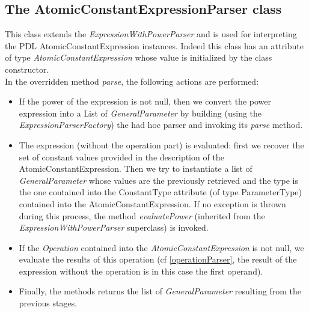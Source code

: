 \documentclass[a4paper,11pt] {ivoa}
\begin{document}
\subsection{The AtomicConstantExpressionParser class}
This class extends the {\it ExpressionWithPowerParser} and is used for interpreting the PDL {AtomicConstantExpression} instances. Indeed this class has an attribute of type {\it AtomicConstantExpression} whose value is initialized by the class constructor.\\
In the overridden method {\it parse}, the following actions are performed:
\begin{itemize}
\item If the power of the expression is not null, then we convert the power expression into a List of {\it GeneralParameter} by building (using the {\it ExpressionParserFactory}) the had hoc parser and invoking its {\it parse} method.
\item The expression (without the operation part) is evaluated: first we recover the set of constant values provided in the description of  the AtomicConstantExpression. Then we try to instantiate a list of {\it GeneralParameter} whose values are the previously retrieved and the type is the one contained into the ConstantType attribute (of type ParameterType) contained into the AtomicConstantExpression. If no exception is thrown during this process, the method {\it evaluatePower} (inherited from the {\it ExpressionWithPowerParser} superclass) is invoked.
\item If the {\it Operation} contained into the {\it AtomicConstantExpression} is not null, we evaluate the results of this operation (cf \ref{operationParser}, the result of the expression without the operation is in this case the first operand).
\item Finally, the methods returns the list of {\it GeneralParameter} resulting from the previous stages.
\end{itemize}
\end{document}
